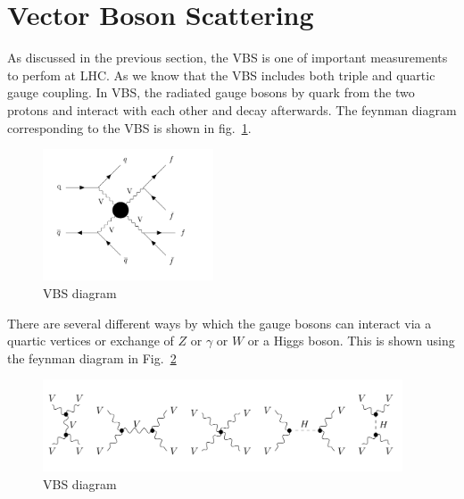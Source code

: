 


\section{Vector Boson Scattering} %
\label{sec:vector_boson_scattering}
As discussed in the previous section, the VBS is one of important measurements to perfom at LHC. As we know that the VBS includes both triple and quartic gauge coupling. In VBS, the radiated gauge bosons by quark from the two protons and interact with each other and decay afterwards. The feynman diagram corresponding to the VBS is shown in fig.~\ref{fig:VBF_vv_vv}.
\begin{figure}[!htbp]
    \centering
    \includegraphics[width=0.45\textwidth]{Pictures/VBF_VV_VV.png}
    \caption{VBS diagram}
    \label{fig:VBF_vv_vv}
\end{figure}

There are several different ways by which the gauge bosons can interact via a quartic vertices or exchange of $Z$ or $\gamma$ or $W$ or a Higgs boson. This is shown using the feynman diagram in Fig.~\ref{fig:VBF_vv_all}
\begin{figure}[!htbp]
    \centering
    \includegraphics[width=0.95\textwidth]{Pictures/VBF_all.png}
    \caption{VBS diagram}
    \label{fig:VBF_vv_all}
\end{figure}

